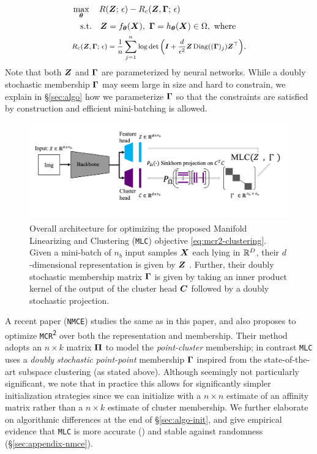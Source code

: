 \documentclass[10pt,twocolumn,letterpaper]{article}
\newcommand{\ours}{MLC}
\newcommand{\mours}{\texttt{\ours}}
\newcommand{\mcr}{\texttt{MCR\textsuperscript{2}}}
\begin{document}
   
   \begin{align}
    & \max_{\btheta} \quad \Rexp-\Rcom{\bGamma}  \label{eq:mcr2-clustering} \\
    & \quad \text{s.t.} \quad  \txtmcrunitnorm, \,\, \txtmcrds, \text{ where } \nonumber\\
      & \medmath{ \Rcom{\bGamma} = \frac{1}{n} \sum_{j=1}^{n} \log\det\left(\mI + \frac{d}{\epsilon^2} \mZ \Diag((\bGamma)_j) \mZ^\top \right)} \nonumber.
   \end{align}
   Note that both ${\bm{Z}}$ and $\boldsymbol{\Gamma}$ are parameterized by neural networks. While a doubly stochastic membership $\boldsymbol{\Gamma}$ may seem large in size and hard to constrain, we explain in \S \ref{sec:algo} how we parameterize $\boldsymbol{\Gamma}$ so that the constraints are satisfied by construction and efficient mini-batching is allowed.
   
   
   \begin{figure}[t]
   \centering\includegraphics[width=0.9\linewidth,trim={0 3cm 0 1cm},clip]{figures/framework/mlc-framework7.png}
   \caption{Overall architecture for optimizing the proposed Manifold Linearizing and Clustering (\mours{}) objective \eqref{eq:mcr2-clustering}. Given a mini-batch of $n_b$ input samples ${\bm{X}}$ each lying in ${\mathbb{R}}^D$, their $d$-dimensional representation is given by ${\bm{Z}}$
   . Further, their doubly stochastic membership matrix $\boldsymbol{\Gamma}$ is given by taking an inner product kernel of the output of the cluster head ${\bm{C}}$ followed by a doubly stochastic projection.}
   \label{fig:arch}
   \end{figure}
   
   
   
    A recent paper (\texttt{NMCE}) \cite{Li2022-vq} studies the same  as in this paper, and also proposes to optimize \mcr{} over both the representation and membership. Their method adopts an $n\times k$ matrix $\boldsymbol{\Pi}$ to model the \textit{point-cluster} membership; in contrast \mours{} uses a \textit{doubly stochastic point-point} membership $\boldsymbol{\Gamma}$ inspired from the state-of-the-art subspace clustering (as stated above). Although seemingly not particularly significant, we note that in practice this allows for significantly simpler initialization strategies since we can initialize with a $n \times n$ estimate of an affinity matrix rather than a $n \times k$ estimate of cluster membership.  We further elaborate on algorithmic differences at the end of \S \ref{sec:algo-init}, and give empirical evidence that \mours{} is more accurate () and stable against randomness (\S \ref{sec:appendix-nmce}). 
   
\end{document}
